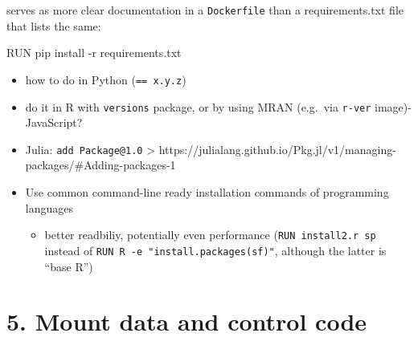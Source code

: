 \documentclass[10pt,letterpaper]{article}
\newenvironment{Shaded}{\begin{snugshade}}{\end{snugshade}}
\newcommand{\ExtensionTok}[1]{#1}
\newcommand{\NormalTok}[1]{#1}
\providecommand{\tightlist}{%
  \setlength{\itemsep}{0pt}\setlength{\parskip}{0pt}}
\begin{document}
serves as more clear documentation in a \texttt{Dockerfile} than a
requirements.txt file that lists the same:

\begin{Shaded}
\begin{Highlighting}[]
\ExtensionTok{RUN}\NormalTok{ pip install -r requirements.txt}
\end{Highlighting}
\end{Shaded}

\begin{itemize}
\tightlist
\item
  how to do in Python (\texttt{==\ x.y.z})
\item
  do it in R with \texttt{versions} package, or by using MRAN (e.g.~via
  \texttt{r-ver} image)- JavaScript?
\item
  Julia: \texttt{add\ Package@1.0} \textgreater{}
  https://julialang.github.io/Pkg.jl/v1/managing-packages/\#Adding-packages-1
\item
  Use common command-line ready installation commands of programming
  languages

  \begin{itemize}
  \tightlist
  \item
    better readbiliy, potentially even performance
    (\texttt{RUN\ install2.r\ sp} instead of
    \texttt{RUN\ R\ -e\ "install.packages(\textquotesingle{}sf\textquotesingle{})"},
    although the latter is ``base R'')
  \end{itemize}
\end{itemize}

\hypertarget{mount-data-and-control-code}{%
\section*{5. Mount data and control
code}\label{mount-data-and-control-code}}
\end{document}
